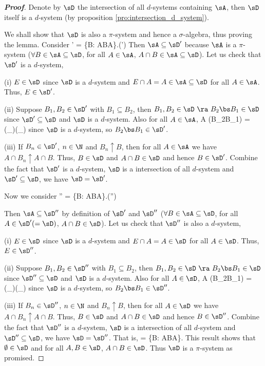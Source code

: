 \begin{proof}[\bf Proof]
Denote by $\sD$ the intersection of all $d$-systems containing $\sA$, then $\sD$ itself is a $d$-system (by proposition \ref{pro:intersection_d_system}).

We shall show that $\sD$ is also a $\pi$-system and hence a $\sigma$-algebra, thus proving the lemma. Consider
\be
\sD' = \{B\in \sD: A\cap B\in \sD {}A\in \sA\}.\quad\quad\quad(\sD'\subseteq \sD)
\ee
Then $\sA\subseteq \sD'$ because $\sA$ is a $\pi$-system ($\forall B\in \sA\subseteq \sD$, for all $A\in \sA$, $A\cap B\in \sA \subseteq \sD$). Let us check that $\sD'$ is a $d$-system,
\ben
\item[(i)] $E\in \sD$ since $\sD$ is a $d$-system and $E\cap A = A \in \sA \subseteq \sD$ for all $A\in \sA$. Thus, $E\in \sD'$.
\item[(ii)] Suppose $B_1,B_2\in \sD'$ with $B_1\subseteq B_2$, then $B_1,B_2\in \sD \ \ra \ B_2\bs B_1\in \sD$ since $\sD'\subseteq \sD$ and $\sD$ is a $d$-system. Also for all $A\in \sA$,
\be
A \cap (B_2\bs B_1) = (_{\in \sD})\bs (_{\in \sD}) \in \sD
\ee
since $\sD$ is a $d$-system, so $B_2\bs B_1 \in \sD'$.
\item[(iii)] If $B_n\in \sD'$, $n\in \N$ and $B_n\uparrow B$, then for all $A\in \sA$ we have $A\cap B_n\uparrow A\cap B$. Thus, $B\in \sD$ and $A\cap B\in \sD$ and hence $B\in \sD'$.
\een
Combine the fact that $\sD'$ is a $d$-system, $\sD$ is a intersection of all $d$-system and $\sD'\subseteq \sD$, we have $\sD = \sD'$.

Now we consider
\be
\sD'' = \{B\in \sD: A\cap B\in \sD {}A\in \sD\}.\quad\quad\quad(\sD''\subseteq \sD)
\ee

Then $\sA\subseteq \sD''$ by definition of $\sD'$ and $\sD''$ ($\forall B\in \sA\subseteq \sD$, for all $A\in \sD'(=\sD)$, $A\cap B\in \sD$). Let us check that $\sD''$ is also a $d$-system,
\ben
\item[(i)] $E\in \sD$ since $\sD$ is a $d$-system and $E\cap A = A \in \sD$ for all $A\in \sD$. Thus, $E\in \sD''$.
\item[(ii)] Suppose $B_1,B_2\in \sD''$ with $B_1\subseteq B_2$, then $B_1,B_2\in \sD \ \ra \ B_2\bs B_1\in \sD$ since $\sD''\subseteq \sD$ and $\sD$ is a $d$-system. Also for all $A\in \sD$,
\be
A \cap (B_2\bs B_1) = (_{\in \sD})\bs (_{\in \sD}) \in \sD
\ee
since $\sD$ is a $d$-system, so $B_2\bs B_1 \in \sD''$.
\item[(iii)] If $B_n\in \sD''$, $n\in \N$ and $B_n\uparrow B$, then for all $A\in \sD$ we have $A\cap B_n\uparrow A\cap B$. Thus, $B\in \sD$ and $A\cap B\in \sD$ and hence $B\in \sD''$.
\een
Combine the fact that $\sD''$ is a $d$-system, $\sD$ is a intersection of all $d$-system and $\sD''\subseteq \sD$, we have $\sD = \sD''$. That is,
\be
\sD = \{B\in \sD: A\cap B\in \sD {}A\in \sD\}.
\ee
This result shows that $\emptyset\in \sD$ and for all $A,B\in \sD$, $A\cap B \in \sD$. Thus $\sD$ is a $\pi$-system as promised.
\end{proof}

